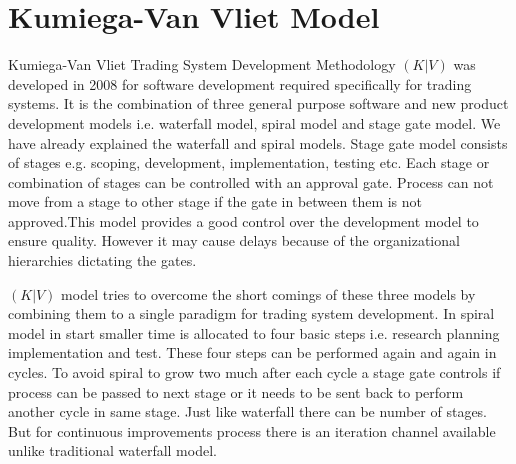 \section{Kumiega-Van Vliet Model}   
      
Kumiega-Van Vliet Trading System Development Methodology \((K|V)\) was developed in 2008 for software development required specifically for trading systems. It is the combination of three general purpose software and new product development models i.e. waterfall model, spiral model and stage gate model. We have already explained the waterfall and spiral models. Stage gate model consists of stages e.g. scoping, development, implementation, testing etc. Each stage or combination of stages can be controlled with an approval gate. Process can not move from a stage to other stage if the gate in between them is not approved.This model provides a good control over the development model to ensure quality. However it may cause delays because of the organizational hierarchies dictating the gates.

 \((K|V)\) model tries to overcome the short comings of these three models by combining them to a single paradigm for trading system development\cite{kumiega2008software}. In spiral model in start smaller time is allocated to four basic steps i.e. research planning implementation and test. These four steps can be performed again and again in cycles. To avoid spiral to grow two much after each cycle a stage gate controls if process can be passed to next stage or it needs to be sent back to perform another cycle in same stage. Just like waterfall there can be number of stages. But for continuous improvements process there is an iteration channel available unlike traditional waterfall model.
